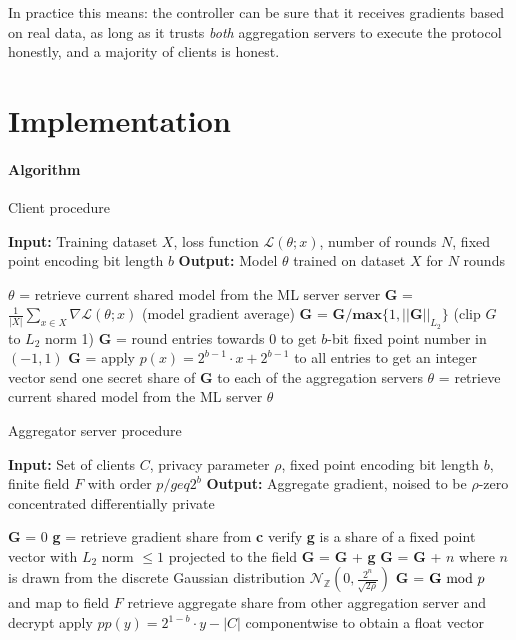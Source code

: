 \documentclass{article}
\begin{document}
In practice this means: the controller can be sure that it receives gradients
based on real data, as long as it trusts \textit{both} aggregation servers to
execute the protocol honestly, and a majority of clients is honest.


\section{Implementation}




\paragraph{Algorithm}

\begin{algorithm}
  \caption{Client procedure}\label{client}

  \begin{algorithmic}[1]
  \State\textbf{Input:} Training dataset $X$, loss function $\mathcal L(\theta; x)$, number of rounds $N$, fixed point encoding bit length $b$
  \State\textbf{Output:} Model $\theta$ trained on dataset $X$ for $N$ rounds

  \State$\theta$ = retrieve current shared model from the ML server server
  \State\textbf{G} = $\frac{1}{|X|} \sum_{x\in X} \nabla\mathcal L(\theta; x)$ (model gradient average)
  \State\textbf{G} = $\textbf{G}/\mathbf{max}\{1,||\textbf{G}||_{L_2}\}$ (clip $G$ to $L_2$ norm 1)
  \State\textbf{G} = round entries towards $0$ to get $b$-bit fixed point number in $(-1, 1)$
  \State\textbf{G} = apply $p(x) = 2^{b-1}\cdot x + 2^{b-1}$ to all entries to get an integer vector
  \State send one secret share of \textbf{G} to each of the aggregation servers
  \EndFor
  \State$\theta$ = retrieve current shared model from the ML server
  \State\Return $\theta$
  \end{algorithmic}
\end{algorithm}


\begin{algorithm}
  \caption{Aggregator server procedure}\label{server}
  \begin{algorithmic}[1]
  \State \textbf{Input:} Set of clients $C$, privacy parameter $\rho$, fixed point encoding bit length $b$, finite field $F$ with order $p /geq 2^b$
  \State \textbf{Output:} Aggregate gradient, noised to be $\rho$-zero concentrated differentially private

  \State \textbf{G} = 0
       \State \textbf{g} = retrieve gradient share from \textbf{c}
	   \State verify \textbf{g} is a share of a fixed point vector with $L_2$ norm $\leq 1$ projected to the field
	   \State \textbf{G} = \textbf{G} + \textbf{g}
  \EndFor
  \State \textbf{G} = \textbf{G} + $n$ where $n$ is drawn from the discrete Gaussian distribution $\mathcal N_\mathbb{Z}(0,\frac{2^n}{\sqrt{2\rho}})$
  \State \textbf{G} = $\textbf{G}\textnormal{ mod } p$ and map to field $F$
  \State retrieve aggregate share from other aggregation server and decrypt
  \State apply $pp(y) = 2^{1-b} \cdot y - |C|$ componentwise to obtain a float vector
  \end{algorithmic}
\end{algorithm}
\end{document}

